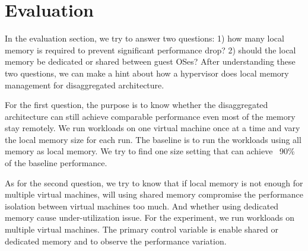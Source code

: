 \documentclass[twocolumn]{article}
\begin{document}
\section{Evaluation}
In the evaluation section, we try to answer two questions: 1) how many local memory is required to prevent significant performance drop? 2) should the local memory be dedicated or shared between guest OSes? After understanding these two questions, we can make a hint about how a hypervisor does local memory management for disaggregated architecture.

For the first question, the purpose is to know whether the disaggregated architecture can still achieve comparable performance even most of the memory stay remotely. We run workloads on one virtual machine once at a time and vary the local memory size for each run. The baseline is to run the workloads using all memory as local memory. We try to find one size setting that can achieve ~90\% of the baseline performance.

As for the second question, we try to know that if local memory is not enough for multiple virtual machines, will using shared memory compromise the performance isolation between virtual machines too much. And whether using dedicated memory cause under-utilization issue. For the experiment, we run workloads on multiple virtual machines. The primary control variable is enable shared or dedicated memory and to observe the performance variation.

{}

\end{document}
